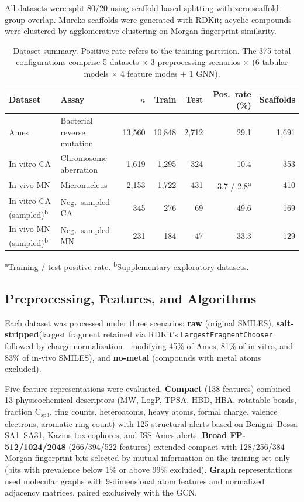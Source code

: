 All datasets were split 80/20 using scaffold-based splitting\cite{Sheridan_2013} with zero scaffold-group overlap.
Murcko scaffolds\cite{Bemis_Murcko_1996} were generated with RDKit;\cite{RDKit} acyclic compounds were clustered by agglomerative clustering on Morgan fingerprint\cite{Rogers_Hahn_2010} similarity.

\begin{table}[ht]
\caption{Dataset summary. Positive rate refers to the training partition. The 375 total configurations comprise 5 datasets $\times$ 3 preprocessing scenarios $\times$ (6 tabular models $\times$ 4 feature modes + 1 GNN).}
\label{tab:datasets}
\centering
\small
\begin{tabular}{@{}llrrrrr@{}}
\toprule
Dataset & Assay & $n$ & Train & Test & Pos.\ rate (\%) & Scaffolds \\
\midrule
Ames & Bacterial reverse mutation & 13,560 & 10,848 & 2,712 & 29.1 & 1,691 \\
In vitro CA & Chromosome aberration & 1,619 & 1,295 & 324 & 10.4 & 353 \\
In vivo MN & Micronucleus & 2,153 & 1,722 & 431 & 3.7 / 2.8\textsuperscript{a} & 410 \\
\midrule
In vitro CA (sampled)\textsuperscript{b} & Neg.\ sampled CA & 345 & 276 & 69 & 49.6 & 169 \\
In vivo MN (sampled)\textsuperscript{b} & Neg.\ sampled MN & 231 & 184 & 47 & 33.3 & 129 \\
\bottomrule
\end{tabular}

\medskip
\footnotesize
\textsuperscript{a}Training / test positive rate. \textsuperscript{b}Supplementary exploratory datasets.
\end{table}

\subsection{Preprocessing, Features, and Algorithms}

Each dataset was processed under three scenarios: \textbf{raw} (original SMILES), \textbf{salt-stripped}(largest fragment retained via RDKit's \texttt{LargestFragmentChooser}\cite{RDKit} followed
by charge normalization---modifying 45\% of Ames, 81\% of in-vitro, and 83\% of in-vivo SMILES), and \textbf{no-metal} (compounds with metal atoms excluded).

Five feature representations were evaluated. \textbf{Compact} (138 features) combined 13 physicochemical descriptors (MW, LogP, TPSA, HBD, HBA, rotatable bonds, fraction $\mathrm{C_{sp3}}$,
ring counts, heteroatoms, heavy atoms, formal charge, valence electrons, aromatic ring count) with 125 structural alerts based on Benigni--Bossa SA1--SA31,\cite{Benigni_Bossa_2008,Benigni_2013}
Kazius toxicophores,\cite{Kazius_2005} and ISS Ames alerts. \textbf{Broad FP-512/1024/2048} (266/394/522 features) extended compact with 128/256/384 Morgan fingerprint bits\cite{Rogers_Hahn_2010}
selected by mutual information\cite{Kraskov_2004} on the training set only (bits with prevalence below 1\% or above 99\% excluded). \textbf{Graph} representations used molecular graphs with 9-dimensional atom features 
and normalized adjacency matrices, paired exclusively with the GCN.


